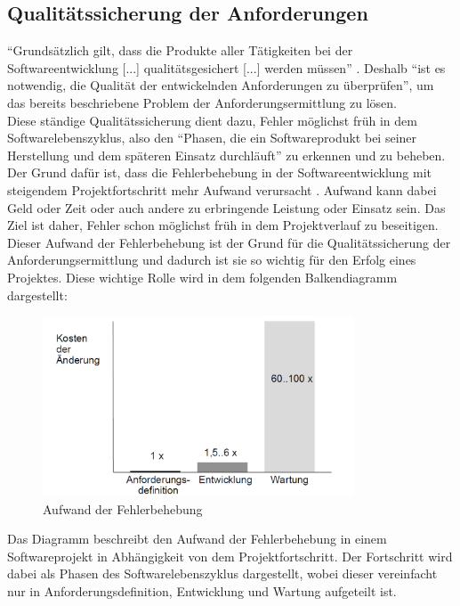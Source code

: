 \documentclass [12pt, a4paper, oneside, titlepage, ngerman]{article}
\begin{document}
\subsection{Qualitätssicherung der Anforderungen}
"`Grundsätzlich gilt, dass die Produkte aller Tätigkeiten bei der Softwareentwicklung [...] qualitätsgesichert [...] werden müssen"' \cite[S.55]{Winter1999}. Deshalb "`ist es notwendig, die Qualität der entwickelnden Anforderungen zu überprüfen"'\cite[S.95]{PohlRupp2015}, um das bereits beschriebene Problem der Anforderungsermittlung zu lösen. \\
Diese ständige Qualitätssicherung dient dazu, Fehler möglichst früh in dem Softwarelebenszyklus, also den "`Phasen, die ein Softwareprodukt bei seiner Herstellung und dem späteren Einsatz durchläuft"' \cite[S.173]{gabler} zu erkennen und zu beheben. Der Grund dafür ist, dass die Fehlerbehebung in der Softwareentwicklung mit steigendem Projektfortschritt mehr Aufwand verursacht \cite[vgl. S.2]{Hussmann}. Aufwand kann dabei Geld oder Zeit oder auch andere zu erbringende Leistung oder Einsatz sein. Das Ziel ist daher, Fehler schon möglichst früh in dem Projektverlauf zu beseitigen. \\

\noindent Dieser Aufwand der Fehlerbehebung ist der Grund für die Qualitätssicherung der Anforderungsermittlung und dadurch ist sie so wichtig für den Erfolg eines Projektes. Diese wichtige Rolle wird in dem folgenden Balkendiagramm dargestellt:
\begin{figure}[H]
	\hspace{-2cm}
	\centering
	\includegraphics[width=350px,keepaspectratio]{TUDresden.png}
	\caption{Aufwand der Fehlerbehebung}
	\label{img:TUDresden}
\end{figure}
\noindent Das Diagramm beschreibt den Aufwand der Fehlerbehebung in einem Softwareprojekt in Abhängigkeit von dem Projektfortschritt. Der Fortschritt wird dabei als Phasen des Softwarelebenszyklus dargestellt, wobei dieser vereinfacht nur in Anforderungsdefinition, Entwicklung und Wartung aufgeteilt ist. \\
\end{document}
